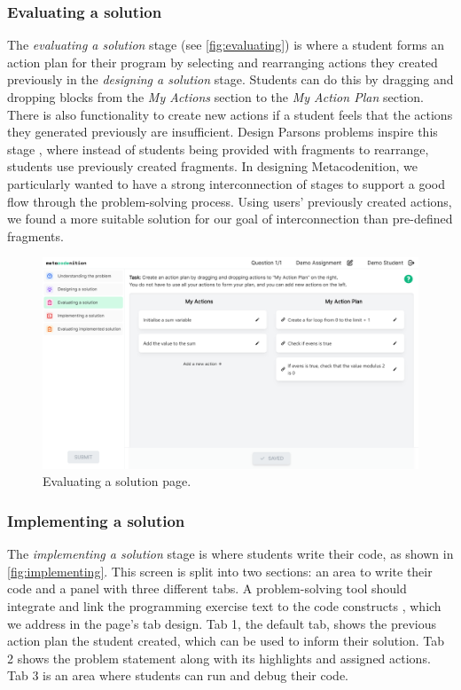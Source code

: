 \documentclass[sigconf,anonymous]{acmart}
\begin{document}
\subsubsection{Evaluating a solution} \label{sec:design-interventions-evaluating}
The \emph{evaluating a solution} stage (see \autoref{fig:evaluating}) is where a student forms an action plan for their program by selecting and rearranging actions they created previously in the \emph{designing a solution} stage. Students can do this by dragging and dropping blocks from the \emph{My Actions} section to the \emph{My Action Plan} section. There is also functionality to create new actions if a student feels that the actions they generated previously are insufficient. Design Parsons problems inspire this stage \cite{garcia2021}, where instead of students being provided with fragments to rearrange, students use previously created fragments. In designing Metacodenition, we particularly wanted to have a strong interconnection of stages to support a good flow through the problem-solving process. Using users' previously created actions, we found a more suitable solution for our goal of interconnection than pre-defined fragments.

\begin{figure}[h!]
  \centering
  \includegraphics[width=\linewidth]{evaluating-a-solution}
  \caption{Evaluating a solution page.}
  \label{fig:evaluating}
\end{figure}

\subsubsection{Implementing a solution} \label{sec:design-interventions-implementing}
The \emph{implementing a solution} stage is where students write their code, as shown in \autoref{fig:implementing}. This screen is split into two sections: an area to write their code and a panel with three different tabs. A problem-solving tool should integrate and link the programming exercise text to the code constructs \cite{saenz2022}, which we address in the page's tab design. Tab 1, the default tab, shows the previous action plan the student created, which can be used to inform their solution. Tab 2 shows the problem statement along with its highlights and assigned actions. Tab 3 is an area where students can run and debug their code.
\end{document}
